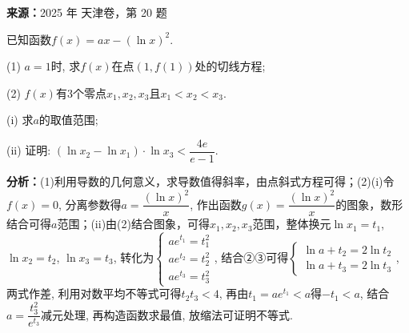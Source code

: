 \begin{question}[points=15]
\textbf{来源：}2025 年 天津卷，第 20 题\par
已知函数$f(x) = ax - (\ln x)^2$.

(1) $a = 1$时, 求$f(x)$在点$(1, f(1))$处的切线方程;

(2) $f(x)$有3个零点$x_1, x_2, x_3$且$x_1 < x_2 < x_3$.

(i) 求$a$的取值范围;

(ii) 证明: $(\ln x_2 - \ln x_1) \cdot \ln x_3 < \dfrac{4e}{e-1}$.
\begin{solution}

\textbf{分析：}(1)利用导数的几何意义，求导数值得斜率，由点斜式方程可得；(2)(i)令$f(x)=0$, 分离参数得$a = \dfrac{(\ln x)^2}{x}$, 作出函数$g(x) = \dfrac{(\ln x)^2}{x}$的图象，数形结合可得$a$范围；(ii)由(2)结合图象，可得$x_1, x_2, x_3$范围，整体换元$\ln x_1 = t_1$, $\ln x_2 = t_2$, $\ln x_3 = t_3$, 转化为$\begin{cases} ae^{t_1} = t_1^2 \\ ae^{t_2} = t_2^2 \\ ae^{t_3} = t_3^2 \end{cases}$, 结合②③可得$\begin{cases} \ln a + t_2 = 2\ln t_2 \\ \ln a + t_3 = 2\ln t_3 \end{cases}$, 两式作差, 利用对数平均不等式可得$t_2 t_3 < 4$, 再由$t_1 = ae^{t_1} < a$得$-t_1 < a$, 结合$a = \dfrac{t_3^2}{e^{t_3}}$减元处理, 再构造函数求最值, 放缩法可证明不等式.


\end{solution}
\end{question}
